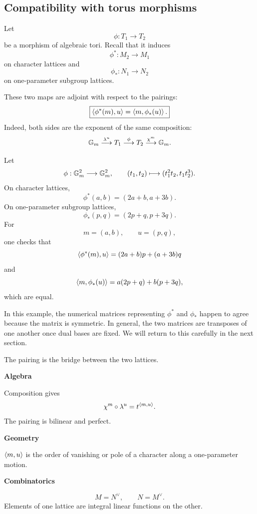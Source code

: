 \subsection{Compatibility with torus morphisms}

Let
\[
\phi:T_1\longrightarrow T_2
\]
be a morphism of algebraic tori. Recall that it induces
\[
\phi^*:M_2\longrightarrow M_1
\]
on character lattices and
\[
\phi_*:N_1\longrightarrow N_2
\]
on one-parameter subgroup lattices.

These two maps are adjoint with respect to the pairings:
\[
\boxed{
\left\langle \phi^*(m),u\right\rangle
=
\left\langle m,\phi_*(u)\right\rangle.
}
\]
Indeed, both sides are the exponent of the same composition:
\[
\mathbb{G}_{m}
\overset{\lambda^{u}}{\longrightarrow}
T_1
\overset{\phi}{\longrightarrow}
T_2
\overset{\chi^{m}}{\longrightarrow}
\mathbb{G}_{m}.
\]

\begin{example}
Let
\[
\phi:\mathbb{G}_{m}^2\longrightarrow\mathbb{G}_{m}^2,
\qquad
(t_1,t_2)\longmapsto(t_1^2t_2,t_1t_2^3).
\]
On character lattices,
\[
\phi^*(a,b)
=
(2a+b,a+3b).
\]
On one-parameter subgroup lattices,
\[
\phi_*(p,q)
=
(2p+q,p+3q).
\]
For
\[
m=(a,b),
\qquad
u=(p,q),
\]
one checks that
\[
\left\langle \phi^*(m),u\right\rangle
=
(2a+b)p+(a+3b)q
\]
and
\[
\left\langle m,\phi_*(u)\right\rangle
=
a(2p+q)+b(p+3q),
\]
which are equal.
\end{example}

In this example, the numerical matrices representing \(\phi^*\) and
\(\phi_*\) happen to agree because the matrix is symmetric. In
general, the two matrices are transposes of one another once dual
bases are fixed. We will return to this carefully in the next
section.

\begin{threedictionaries}
The pairing is the bridge between the two lattices.

\medskip

\noindent
\begin{minipage}[t]{0.30\linewidth}
\centering
\textbf{Algebra}\par
\smallskip
Composition gives
\[
\chi^{m}\circ\lambda^{u}
=
t^{\left\langle m,u\right\rangle}.
\]
The pairing is bilinear and perfect.
\end{minipage}
\hfill
\begin{minipage}[t]{0.30\linewidth}
\centering
\textbf{Geometry}\par
\smallskip
\(\left\langle m,u\right\rangle\) is the order of vanishing or pole of a character along
a one-parameter motion.
\end{minipage}
\hfill
\begin{minipage}[t]{0.30\linewidth}
\centering
\textbf{Combinatorics}\par
\smallskip
\[
M=N^\vee,
\qquad
N=M^\vee.
\]
Elements of one lattice are integral linear functions on the other.
\end{minipage}
\end{threedictionaries}

